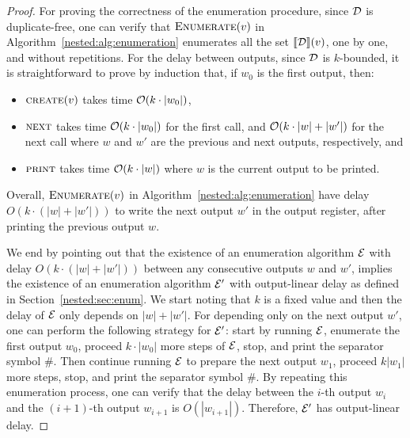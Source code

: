 \begin{proof}
For proving the correctness of the enumeration procedure, since $\mathcal{D}$ is duplicate-free, one can verify that $\textsc{Enumerate}(v)$ in Algorithm~\ref{nested:alg:enumeration} enumerates all the set ${\llbracket{\mathcal{D}}\rrbracket}(v)$, one by one, and without repetitions. For the delay between outputs, since $\mathcal{D}$ is $k$-bounded, it is straightforward to prove by induction that, if $w_0$ is the first output, then:
\begin{itemize}
	\item $\textsc{create}(v)$ takes time $\mathcal{O}(k\cdot |w_0|)$,
	\item $\textsc{next}$ takes time $\mathcal{O}(k\cdot |w_0|)$ for the first call, and $\mathcal{O}(k\cdot |w|+|w'|)$ for the next call where $w$ and $w'$ are the previous and next outputs, respectively, and
	\item $\textsc{print}$ takes time $\mathcal{O}(k\cdot |w|)$ where $w$ is the current output to be printed.  
\end{itemize}
Overall, $\textsc{Enumerate}(v)$ in Algorithm~\ref{nested:alg:enumeration} have delay $O(k\cdot (|w| + |w'|))$ to write the next output $w'$ in the output register, after printing the previous output $w$. 

We end by pointing out that the existence of an enumeration algorithm $\mathcal{E}$ with delay $O(k\cdot (|w| + |w'|))$ between any consecutive outputs $w$ and $w'$, implies the existence of an enumeration algorithm $\mathcal{E}'$ with output-linear delay as defined in Section~\ref{nested:sec:enum}. We start noting that $k$ is a fixed value and then the delay of $\mathcal{E}$ only depends on $|w| + |w'|$. For depending only on the next output $w'$, one can perform the following strategy for $\mathcal{E}'$: start by running $\mathcal{E}$, enumerate the first output $w_0$, proceed $k \cdot |w_0|$ more steps of $\mathcal{E}$, stop, and print the separator symbol $\#$. Then continue running $\mathcal{E}$ to prepare the next output $w_1$, proceed $k |w_1|$ more steps, stop, and print the separator symbol $\#$. By repeating this enumeration process, one can verify that the delay between the $i$-th output $w_i$ and the $(i+1)$-th output $w_{i+1}$ is $O(|w_{i+1}|)$. Therefore, $\mathcal{E}'$ has output-linear delay. 
\end{proof}